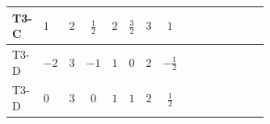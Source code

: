 \documentclass[8pt]{article}
\begin{document}
\begin{landscape}
\begin{longtable}{@{}llcccccc >{\raggedright\arraybackslash}p{0.21\linewidth} >{\raggedright\arraybackslash}p{0.21\linewidth} >{\raggedright\arraybackslash}p{0.21\linewidth}@{}}
T3-C & $1$ & $2$ & $\frac{1}{2}$ & $2$ & $\frac{3}{2}$ & $3$ & $1$ & \scriptsize\adjustbox{max width=\linewidth}{$\begin{gathered} -\frac{3}{2} (\left({Y_d}\,\left({Y_d}\right)^{\dagger}\,{Y_u}\right)_{ij}-\left({Y_u}\,\left({Y_u}\right)^{\dagger}\,{Y_u}\right)_{ij})\end{gathered}$} & \scriptsize\adjustbox{max width=\linewidth}{$\begin{gathered} -\frac{9}{4} {g_2}^2 \left({Y_u}\right)_{ij}\end{gathered}$} & \scriptsize\adjustbox{max width=\linewidth}{$\begin{gathered} -8 {g_3}^2 \left({Y_u}\right)_{ij}\end{gathered}$} \\
\midrule
T3-D & $-2$ & $3$ & $-1$ & $1$ & $0$ & $2$ & $-\frac{1}{2}$ & \scriptsize\adjustbox{max width=\linewidth}{$\begin{gathered} -\frac{3}{2} (\left({Y_d}\,\left({Y_d}\right)^{\dagger}\,{Y_u}\right)_{ij}-\left({Y_u}\,\left({Y_u}\right)^{\dagger}\,{Y_u}\right)_{ij})\end{gathered}$} & \scriptsize\adjustbox{max width=\linewidth}{$\begin{gathered} -\frac{9}{4} {g_2}^2 \left({Y_u}\right)_{ij}\end{gathered}$} & \scriptsize\adjustbox{max width=\linewidth}{$\begin{gathered} -8 {g_3}^2 \left({Y_u}\right)_{ij}\end{gathered}$} \\
\midrule
T3-D & $0$ & $3$ & $0$ & $1$ & $1$ & $2$ & $\frac{1}{2}$ & \scriptsize\adjustbox{max width=\linewidth}{$\begin{gathered} -\frac{3}{2} (\left({Y_d}\,\left({Y_d}\right)^{\dagger}\,{Y_u}\right)_{ij}-\left({Y_u}\,\left({Y_u}\right)^{\dagger}\,{Y_u}\right)_{ij})\end{gathered}$} & \scriptsize\adjustbox{max width=\linewidth}{$\begin{gathered} -\frac{9}{4} {g_2}^2 \left({Y_u}\right)_{ij}\end{gathered}$} & \scriptsize\adjustbox{max width=\linewidth}{$\begin{gathered} -8 {g_3}^2 \left({Y_u}\right)_{ij}\end{gathered}$} \\
\midrule

\end{longtable}
\end{landscape}
\end{document}
